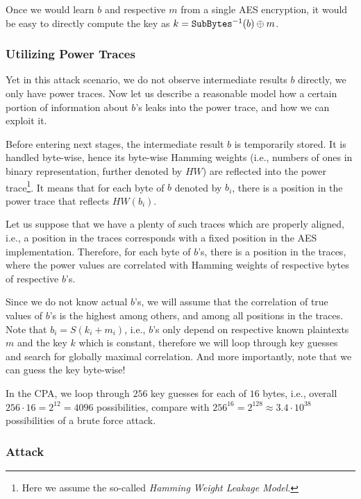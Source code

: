 	Once we would learn $b$ and respective $m$ from a single AES encryption, it would be easy to directly compute the key as $k = {\texttt{SubBytes}}^{-1}(b)\oplus m$.

\subsubsection{Utilizing Power Traces}
	
	Yet in this attack scenario, we do not observe intermediate results $b$ directly, we only have power traces. Now let us describe a reasonable model how a certain portion of information about $b$'s leaks into the power trace, and how we can exploit it.
	
	Before entering next stages, the intermediate result $b$ is temporarily stored. It is handled byte-wise, hence its byte-wise Hamming weights (i.e., numbers of ones in binary representation, further denoted by $HW$) are reflected into the power trace\footnote{Here we assume the so-called {\em Hamming Weight Leakage Model}.}. It means that for each byte of $b$ denoted by $b_i$, there is a position in the power trace that reflects $HW(b_i)$.
	
	Let us suppose that we have a plenty of such traces which are properly aligned, i.e., a position in the traces corresponds with a fixed position in the AES implementation. Therefore, for each byte of $b$'s, there is a position in the traces, where the power values are correlated with Hamming weights of respective bytes of respective $b$'s.
	
	Since we do not know actual $b$'s, we will assume that the correlation of true values of $b$'s is the highest among others, and among all positions in the traces. Note that $b_i = S(k_i+m_i)$, i.e., $b$'s only depend on respective known plaintexts $m$ and the key $k$ which is constant, therefore we will loop through key guesses and search for globally maximal correlation. And more importantly, note that we can guess the key byte-wise!
	
	\begin{note}
	\label{note:brutevssca}
		In the CPA, we loop through $256$ key guesses for each of $16$ bytes, i.e., overall $256\cdot 16 = 2^{12} = 4096$ possibilities, compare with $256^{16} = 2^{128} \approx 3.4\cdot10^{38}$ possibilities of a brute force attack.
	\end{note}

\subsubsection{Attack}
	
